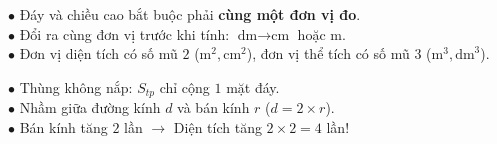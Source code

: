 \documentclass[14pt,a4paper,oneside]{extbook}
\begin{document}
\noindent
\begin{minipage}[t]{0.54\textwidth}
  \begin{tcolorbox}[
    enhanced,
    title={\footnotesize\bfseries\color{white}\faCheckDouble\ Quy tắc đồng nhất đơn vị đo},
    colback=green!3!white,
    colframe=green!60!black,
    arc=2.5mm, boxrule=0.8pt, top=1.8mm, bottom=1.8mm, left=2.2mm, right=2.2mm
  ]
    \footnotesize
    $\bullet$ Đáy và chiều cao bắt buộc phải \textbf{cùng một đơn vị đo}.\\
    $\bullet$ Đổi ra cùng đơn vị trước khi tính: $\text{dm} \rightarrow \text{cm}$ hoặc $\text{m}$.\\
    $\bullet$ Đơn vị diện tích có số mũ $2$ ($\text{m}^2, \text{cm}^2$), đơn vị thể tích có số mũ $3$ ($\text{m}^3, \text{dm}^3$).
  \end{tcolorbox}
\end{minipage}%
\hfill
\begin{minipage}[t]{0.44\textwidth}
  \begin{tcolorbox}[
    enhanced,
    title={\footnotesize\bfseries\color{white}\faExclamationTriangle\ Mẹo tránh bẫy trắc nghiệm},
    colback=red!2!white,
    colframe=red!70!black,
    arc=2.5mm, boxrule=0.8pt, top=1.8mm, bottom=1.8mm, left=2.2mm, right=2.2mm
  ]
    \footnotesize
    $\bullet$ Thùng không nắp: $S_{tp}$ chỉ cộng $1$ mặt đáy.\\
    $\bullet$ Nhầm giữa đường kính $d$ và bán kính $r$ ($d = 2 \times r$).\\
    $\bullet$ Bán kính tăng $2$ lần $\rightarrow$ Diện tích tăng $2 \times 2 = 4$ lần!
  \end{tcolorbox}
\end{minipage}
\end{document}
